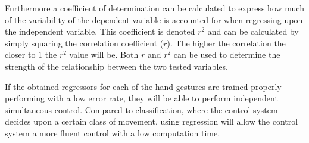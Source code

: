 Furthermore a coefficient of determination can be calculated to express how much of the variability of the dependent variable is accounted for when regressing upon the independent variable. This coefficient is denoted $r^{2}$ and can be calculated by simply squaring the correlation coefficient ($r$). The higher the correlation the closer to $1$ the $r^2$ value will be. 
Both $r$ and $r^{2}$ can be used to determine the strength of the relationship between the two tested variables. \cite{zar2009}

If the obtained regressors for each of the hand gestures are trained properly performing with a low error rate, they will be able to perform independent simultaneous control. Compared to classification, where the control system decides upon a certain class of movement, using regression will allow the control system a more fluent control with a low computation time. \cite{hahne2014}



